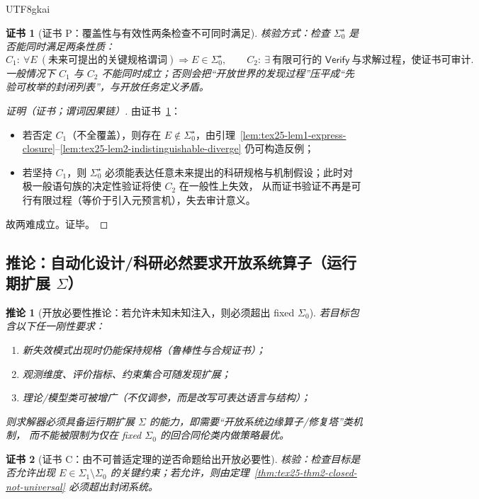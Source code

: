 \documentclass[12pt]{article}
\newtheorem{corollary}{推论}[section]
\newtheorem{Certificate}{证书}[section]
\begin{document}
\begin{CJK*}{UTF8}{gkai}
\begin{Certificate}[证书 P：覆盖性与有效性两条检查不可同时满足]
\label{cert:tex25-preclosure-dilemma}
核验方式：检查 $\Sigma_0^\star$ 是否能同时满足两条性质：
\[
  C_1:\ \forall E\ (\text{未来可提出的关键规格谓词})\Rightarrow E\in\Sigma_0^\star,
  \qquad
  C_2:\ \exists\ \text{有限可行的 }\mathsf{Verify}\ \text{与求解过程，使证书可审计}.
\]
一般情况下 $C_1$ 与 $C_2$ 不能同时成立；否则会把“开放世界的发现过程”压平成“先验可枚举的封闭列表”，与开放任务定义矛盾。
\end{Certificate}

\begin{proof}[证明（证书；谓词因果链）]
由证书~\ref{cert:tex25-preclosure-dilemma}：
\begin{itemize}
  \item 若否定 $C_1$（不全覆盖），则存在 $E\notin\Sigma_0^\star$，由引理~\ref{lem:tex25-lem1-express-closure}--\ref{lem:tex25-lem2-indistinguishable-diverge} 仍可构造反例；
  \item 若坚持 $C_1$，则 $\Sigma_0^\star$ 必须能表达任意未来提出的科研规格与机制假设；此时对极一般语句族的决定性验证将使 $C_2$ 在一般性上失效，
  从而证书验证不再是可行有限过程（等价于引入元预言机），失去审计意义。
\end{itemize}
故两难成立。证毕。
\end{proof}

\subsection{推论：自动化设计/科研必然要求开放系统算子（运行期扩展 $\Sigma$）}
\label{subsec:tex25-cor-open-necessity}

\begin{corollary}[开放必要性推论：若允许未知未知注入，则必须超出 fixed $\Sigma_0$]
\label{cor:tex25-open-necessity}
若目标包含以下任一刚性要求：
\begin{enumerate}
  \item 新失效模式出现时仍能保持规格（鲁棒性与合规证书）；
  \item 观测维度、评价指标、约束集合可随发现扩展；
  \item 理论/模型类可被增广（不仅调参，而是改写可表达语言与结构）；
\end{enumerate}
则求解器必须具备运行期扩展 $\Sigma$ 的能力，即需要“开放系统边缘算子/修复塔”类机制，
而不能被限制为仅在 fixed $\Sigma_0$ 的回合同伦类内做策略最优。
\end{corollary}

\begin{Certificate}[证书 C：由不可普适定理的逆否命题给出开放必要性]
\label{cert:tex25-open-necessity}
核验：检查目标是否允许出现 $E\in\Sigma_1\setminus\Sigma_0$ 的关键约束；若允许，则由定理~\ref{thm:tex25-thm2-closed-not-universal} 必须超出封闭系统。
\end{Certificate}


\end{CJK*}
\end{document}

